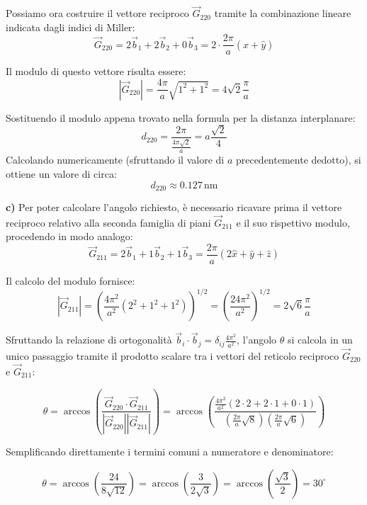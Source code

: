 \begin{exercise}
\begin{solution}
Possiamo ora costruire il vettore reciproco \(\vec{G}_{220}\) tramite la combinazione lineare indicata dagli indici di Miller:
\begin{equation}
    \vec{G}_{220} = 2\vec{b}_1 + 2\vec{b}_2 + 0\vec{b}_3 = 2 \cdot \frac{2\pi}{a} (\hat{x} + \hat{y})
\end{equation}

Il modulo di questo vettore risulta essere:
\begin{equation}
    |\vec{G}_{220}| = \frac{4\pi}{a} \sqrt{1^2 + 1^2} = 4\sqrt{2} \frac{\pi}{a}
\end{equation}

Sostituendo il modulo appena trovato nella formula per la distanza interplanare:
\begin{equation}
    d_{220} = \frac{2\pi}{\frac{4\pi\sqrt{2}}{a}} = a \frac{\sqrt{2}}{4}
\end{equation}
Calcolando numericamente (sfruttando il valore di \(a\) precedentemente dedotto), si ottiene un valore di circa:
\begin{equation}
    d_{220} \approx 0.127 \, \text{nm}
\end{equation}

\textbf{c)}
Per poter calcolare l'angolo richiesto, è necessario ricavare prima il vettore reciproco relativo alla seconda famiglia di piani \(\vec{G}_{211}\) e il suo rispettivo modulo, procedendo in modo analogo:
\begin{equation}
    \vec{G}_{211} = 2\vec{b}_1 + 1\vec{b}_2 + 1\vec{b}_3 = \frac{2\pi}{a} (2\hat{x} + \hat{y} + \hat{z})
\end{equation}

Il calcolo del modulo fornisce:
\begin{equation}
    |\vec{G}_{211}| = \left( \frac{4\pi^2}{a^2} (2^2 + 1^2 + 1^2) \right)^{1/2} = \left( \frac{24\pi^2}{a^2} \right)^{1/2} = 2\sqrt{6} \frac{\pi}{a}
\end{equation}

Sfruttando la relazione di ortogonalità \(\vec{b}_i \cdot \vec{b}_j = \delta_{ij} \frac{4\pi^2}{a^2}\), l'angolo \(\theta\) si calcola in un unico passaggio tramite il prodotto scalare tra i vettori del reticolo reciproco \(\vec{G}_{220}\) e \(\vec{G}_{211}\):

\begin{equation}
    \theta = \arccos \left( \frac{\vec{G}_{220} \cdot \vec{G}_{211}}{|\vec{G}_{220}| |\vec{G}_{211}|} \right) = \arccos \left( \frac{ \frac{4\pi^2}{a^2} (2\cdot 2 + 2\cdot 1 + 0\cdot 1) }{ \left( \frac{2\pi}{a} \sqrt{8} \right) \left( \frac{2\pi}{a} \sqrt{6} \right) } \right)
\end{equation}

Semplificando direttamente i termini comuni a numeratore e denominatore:

\begin{equation}
    \theta = \arccos \left( \frac{24}{8\sqrt{12}} \right) = \arccos \left( \frac{3}{2\sqrt{3}} \right) = \arccos \left( \frac{\sqrt{3}}{2} \right) = 30^\circ
\end{equation}

\end{solution}
\end{exercise}


